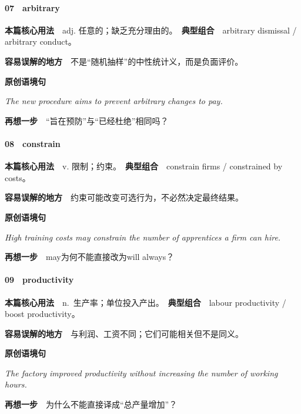 \documentclass[
  11pt,
]{ctexart}
\renewenvironment{quote}{\begin{tcolorbox}[enhanced,breakable,colback=sand,colframe=primary!22,boxrule=0.4pt,arc=2pt,left=2.6mm,right=2.6mm,top=1.6mm,bottom=1.6mm]\itshape}{\end{tcolorbox}}
\begin{document}
\paragraph{07　arbitrary}\label{arbitrary}

\textbf{本篇核心用法}　adj.
任意的；缺乏充分理由的。　\textbf{典型组合}　arbitrary dismissal /
arbitrary conduct。

\textbf{容易误解的地方}　不是``随机抽样''的中性统计义，而是负面评价。

\textbf{原创语境句}

\begin{quote}
The new procedure aims to prevent arbitrary changes to pay.
\end{quote}

\textbf{再想一步}　``旨在预防''与``已经杜绝''相同吗？

\paragraph{08　constrain}\label{constrain}

\textbf{本篇核心用法}　v. 限制；约束。　\textbf{典型组合}　constrain
firms / constrained by costs。

\textbf{容易误解的地方}　约束可能改变可选行为，不必然决定最终结果。

\textbf{原创语境句}

\begin{quote}
High training costs may constrain the number of apprentices a firm can
hire.
\end{quote}

\textbf{再想一步}　may为何不能直接改为will always？

\paragraph{09　productivity}\label{productivity}

\textbf{本篇核心用法}　n.~生产率；单位投入产出。　\textbf{典型组合}　labour
productivity / boost productivity。

\textbf{容易误解的地方}　与利润、工资不同；它们可能相关但不是同义。

\textbf{原创语境句}

\begin{quote}
The factory improved productivity without increasing the number of
working hours.
\end{quote}

\textbf{再想一步}　为什么不能直接译成``总产量增加''？
\end{document}

